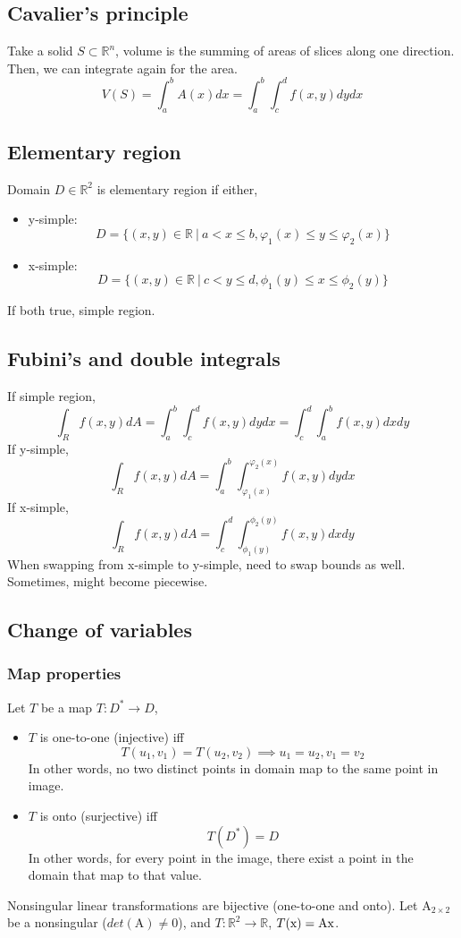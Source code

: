 \subsection*{Cavalier's principle}
Take a solid $S\subset \mathbb{R}^n$, volume is the summing of areas of slices along one direction. Then, we can integrate again for the area.
$$V(S) = \int_{a}^{b}A(x)dx = \int_{a}^{b}\int_{c}^{d}f(x,y)dy dx$$
\subsection*{Elementary region}
Domain $D\in\mathbb{R}^2$ is elementary region if either,
\begin{itemize}
    \item y-simple: $$D=\{(x,y)\in\mathbb{R}~|~a<x\leq b, \varphi_1(x) \leq y \leq \varphi_2(x)\}$$
    \item x-simple: $$D=\{(x,y)\in\mathbb{R}~|~c<y\leq d, \phi_1(y) \leq x \leq \phi_2(y)\}$$
\end{itemize}
If both true, simple region.
\subsection*{Fubini's and double integrals}
If simple region,
$$\int_{R}f(x,y)dA = \int_{a}^{b}\int_{c}^{d} f(x,y) dy dx = \int_{c}^{d}\int_{a}^{b} f(x,y) dx dy$$
If y-simple,
$$\int_{R}f(x,y)dA = \int_{a}^{b}\int_{\varphi_1(x)}^{\varphi_2(x)}f(x,y)dydx$$
If x-simple,
$$\int_{R}f(x,y)dA = \int_{c}^{d}\int_{\phi_1(y)}^{\phi_2(y)}f(x,y)dxdy$$
When swapping from x-simple to y-simple, need to swap bounds as well. Sometimes, might become piecewise.
\subsection*{Change of variables}
\subsubsection*{Map properties}
Let $T$ be a map $T:D^*\to D$,
\begin{itemize}
\item 
$T$ is one-to-one (injective) iff
$$T(u_1,v_1) = T(u_2, v_2) \implies u_1=u_2, v_1=v_2$$
In other words, no two distinct points in domain map to the same point in image.

\item $T$ is onto (surjective) iff $$T(D^*)=D$$
In other words, for every point in the image, there exist a point in the domain that map to that value.
\end{itemize}
Nonsingular linear transformations are bijective (one-to-one and onto). Let $\textrm{A}_{2\times 2}$ be a nonsingular ($det(\textrm{A}    )\neq 0$), and $T:\mathbb{R}^{2}\to \mathbb{R}$, $T(\textrm{x}) = \textrm{A}\textrm{x}$.
